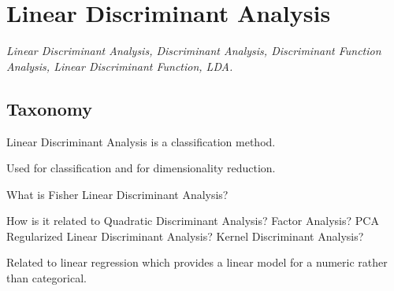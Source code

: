 

\section{Linear Discriminant Analysis} 
\label{sec:lda}

\emph{Linear Discriminant Analysis, Discriminant Analysis, Discriminant Function Analysis, Linear Discriminant Function, LDA.}

\subsection{Taxonomy}
Linear Discriminant Analysis is a classification method.

Used for classification and for dimensionality reduction.

What is Fisher Linear Discriminant Analysis?

How is it related to Quadratic Discriminant Analysis?
Factor Analysis?
PCA
Regularized Linear Discriminant Analysis?
Kernel Discriminant Analysis?

Related to linear regression which provides a linear model for a numeric rather than categorical.


